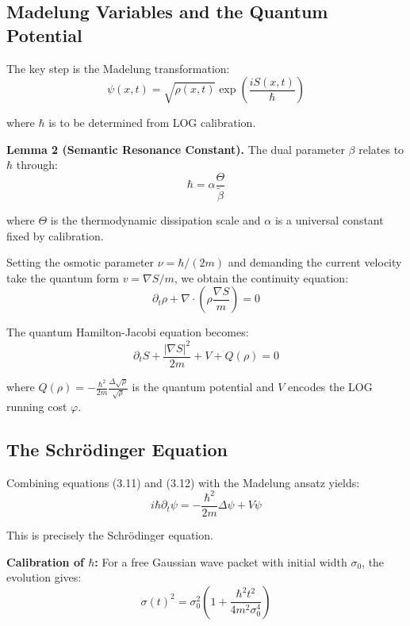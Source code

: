 \documentclass[12pt]{article}
\begin{document}
\subsection{Madelung Variables and the Quantum Potential}

The key step is the Madelung transformation:
\begin{equation}
\psi(x,t) = \sqrt{\rho(x,t)} \exp\left(\frac{iS(x,t)}{\hbar}\right) \tag{3.9}
\end{equation}

where $\hbar$ is to be determined from LOG calibration.

\textbf{Lemma 2 (Semantic Resonance Constant).} The dual parameter $\beta$ relates to $\hbar$ through:
\begin{equation}
\boxed{\hbar = \alpha \frac{\Theta}{\tilde{\beta}}} \tag{3.10}
\end{equation}

where $\Theta$ is the thermodynamic dissipation scale and $\alpha$ is a universal constant fixed by calibration.

Setting the osmotic parameter $\nu = \hbar/(2m)$ and demanding the current velocity take the quantum form $v = \nabla S/m$, we obtain the continuity equation:
\begin{equation}
\partial_t \rho + \nabla \cdot \left(\rho \frac{\nabla S}{m}\right) = 0 \tag{3.11}
\end{equation}

The quantum Hamilton-Jacobi equation becomes:
\begin{equation}
\partial_t S + \frac{|\nabla S|^2}{2m} + V + Q(\rho) = 0 \tag{3.12}
\end{equation}

where $Q(\rho) = -\frac{\hbar^2}{2m}\frac{\Delta\sqrt{\rho}}{\sqrt{\rho}}$ is the quantum potential and $V$ encodes the LOG running cost $\varphi$.

\subsection{The Schrödinger Equation}

Combining equations (3.11) and (3.12) with the Madelung ansatz yields:
\begin{equation}
i\hbar \partial_t \psi = -\frac{\hbar^2}{2m}\Delta \psi + V \psi \tag{3.13}
\end{equation}

This is precisely the Schrödinger equation.

\textbf{Calibration of $\hbar$:} For a free Gaussian wave packet with initial width $\sigma_0$, the evolution gives:
\begin{equation}
\sigma(t)^2 = \sigma_0^2 \left(1 + \frac{\hbar^2 t^2}{4m^2 \sigma_0^4}\right) \tag{3.14}
\end{equation}
\end{document}
